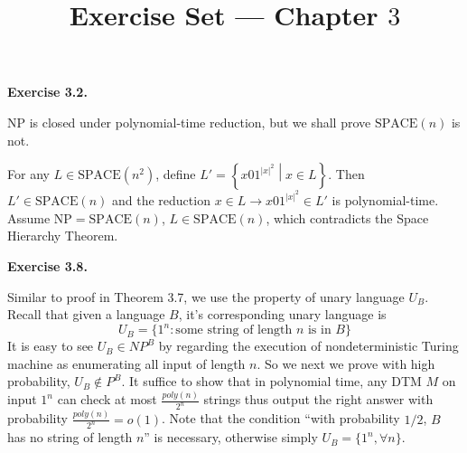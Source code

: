 \documentclass[a4paper]{article}
\title{Exercise Set --- Chapter $3$}
\date{}
\newenvironment{exercise}[1]{
	\par
	\noindent\textbf{Exercise #1.}\quad
}{
	\par
	\bigskip
}
\newcommand{\cbra}[1]{\left\{ #1 \right\}}
\begin{document}
\maketitle

\begin{exercise}{3.2}
    NP is closed under polynomial-time reduction, but we shall prove $\text{SPACE}(n)$ is not.

    For any $L\in\text{SPACE}(n^2)$, define $L'=\cbra{x01^{|x|^2}\middle| x\in L}$.
    Then $L'\in\text{SPACE}(n)$ and the reduction $x\in L\to x01^{|x|^2}\in L'$ is polynomial-time.
    Assume $\text{NP}=\text{SPACE}(n)$, $L\in\text{SPACE}(n)$, which contradicts the Space Hierarchy Theorem.
\end{exercise}

\begin{exercise}{3.8}
    Similar to proof in Theorem 3.7, we use the property of unary language $U_B$. 
    Recall that given a language $B$, it's corresponding unary language is
    $$
    U_B=\{1^n: \text{some string of length $n$ is in $B$}\}
    $$
    It is easy to see $U_B\in NP^B$ by regarding the execution of nondeterministic Turing machine as enumerating all input of length $n$. So we next we prove with high probability, $U_B\not\in P^B$. 
    It suffice to show that in polynomial time, any DTM $M$ on input $1^n$ can check at most $\frac{poly(n)}{2^n}$ strings thus output the right answer with probability $\frac{poly(n)}{2^n}=o(1)$. 
    Note that the condition ``with probability $1/2$, $B$ has no string of length $n$'' is necessary, otherwise simply $U_B=\{1^n, \forall n\}$.

 

\end{exercise}
\end{document}
